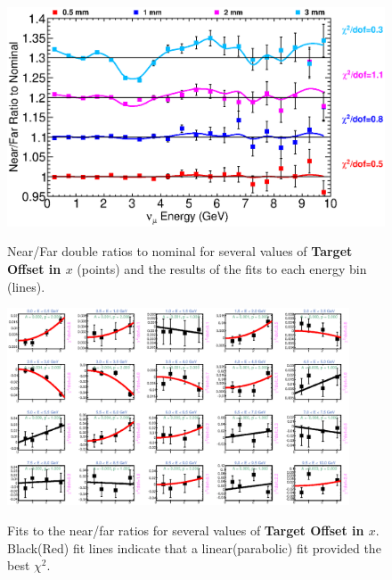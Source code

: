 \begin{figure}[ht]
\label{fig:TargetXOffset_nof_summary}
  \begin{center}
    {\includegraphics[width=6.0in]{figures/TargetXOffset_nof_summary.eps}}
  \end{center}
\caption{ Near/Far double ratios to nominal for several values of {\bf Target Offset in $x$} (points) and the results of the fits to each energy bin (lines).}
\end{figure}

\begin{figure}[ht]
\label{fig:TargetXOffset_nof_fits}
  \begin{center}
    {\includegraphics[width=4.0in]{figures/TargetXOffset_nof_fits.eps}}
  \end{center}
\caption{ Fits to the near/far ratios for several values of {\bf Target Offset in $x$}. Black(Red) fit lines indicate that a linear(parabolic) fit provided the best $\chi^2$. }
\end{figure}

